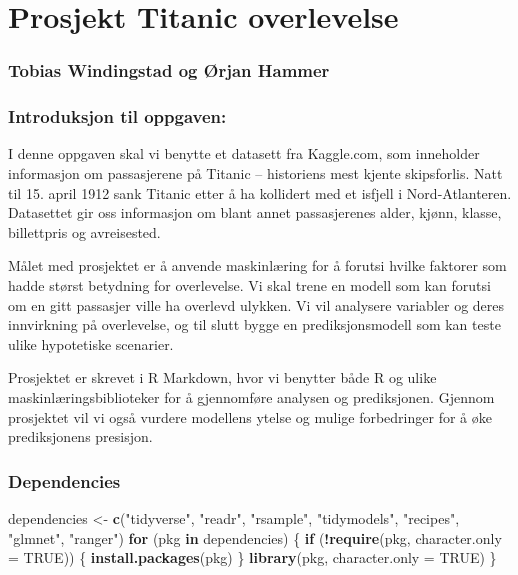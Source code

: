 \documentclass[
]{article}
\author{}
\date{\vspace{-2.5em}}
\newenvironment{Shaded}{\begin{snugshade}}{\end{snugshade}}
\newcommand{\AttributeTok}[1]{\textcolor[rgb]{0.13,0.29,0.53}{#1}}
\newcommand{\ConstantTok}[1]{\textcolor[rgb]{0.56,0.35,0.01}{#1}}
\newcommand{\ControlFlowTok}[1]{\textcolor[rgb]{0.13,0.29,0.53}{\textbf{#1}}}
\newcommand{\FunctionTok}[1]{\textcolor[rgb]{0.13,0.29,0.53}{\textbf{#1}}}
\newcommand{\NormalTok}[1]{#1}
\newcommand{\OtherTok}[1]{\textcolor[rgb]{0.56,0.35,0.01}{#1}}
\newcommand{\SpecialCharTok}[1]{\textcolor[rgb]{0.81,0.36,0.00}{\textbf{#1}}}
\newcommand{\StringTok}[1]{\textcolor[rgb]{0.31,0.60,0.02}{#1}}
\begin{document}
\section{Prosjekt Titanic
overlevelse}\label{prosjekt-titanic-overlevelse}

\subsubsection{Tobias Windingstad og Ørjan
Hammer}\label{tobias-windingstad-og-uxf8rjan-hammer}

\subsubsection{Introduksjon til
oppgaven:}\label{introduksjon-til-oppgaven}

I denne oppgaven skal vi benytte et datasett fra Kaggle.com, som
inneholder informasjon om passasjerene på Titanic -- historiens mest
kjente skipsforlis. Natt til 15. april 1912 sank Titanic etter å ha
kollidert med et isfjell i Nord-Atlanteren. Datasettet gir oss
informasjon om blant annet passasjerenes alder, kjønn, klasse,
billettpris og avreisested.

Målet med prosjektet er å anvende maskinlæring for å forutsi hvilke
faktorer som hadde størst betydning for overlevelse. Vi skal trene en
modell som kan forutsi om en gitt passasjer ville ha overlevd ulykken.
Vi vil analysere variabler og deres innvirkning på overlevelse, og til
slutt bygge en prediksjonsmodell som kan teste ulike hypotetiske
scenarier.

Prosjektet er skrevet i R Markdown, hvor vi benytter både R og ulike
maskinlæringsbiblioteker for å gjennomføre analysen og prediksjonen.
Gjennom prosjektet vil vi også vurdere modellens ytelse og mulige
forbedringer for å øke prediksjonens presisjon.

\subsubsection{Dependencies}\label{dependencies}

\begin{Shaded}
\begin{Highlighting}[]
\NormalTok{dependencies }\OtherTok{\textless{}{-}} \FunctionTok{c}\NormalTok{(}\StringTok{"tidyverse"}\NormalTok{, }\StringTok{"readr"}\NormalTok{, }\StringTok{"rsample"}\NormalTok{, }\StringTok{"tidymodels"}\NormalTok{, }\StringTok{"recipes"}\NormalTok{, }\StringTok{"glmnet"}\NormalTok{, }\StringTok{"ranger"}\NormalTok{)}
\ControlFlowTok{for}\NormalTok{ (pkg }\ControlFlowTok{in}\NormalTok{ dependencies) \{}
  \ControlFlowTok{if}\NormalTok{ (}\SpecialCharTok{!}\FunctionTok{require}\NormalTok{(pkg, }\AttributeTok{character.only =} \ConstantTok{TRUE}\NormalTok{)) \{}
    \FunctionTok{install.packages}\NormalTok{(pkg)}
\NormalTok{  \}}
  \FunctionTok{library}\NormalTok{(pkg, }\AttributeTok{character.only =} \ConstantTok{TRUE}\NormalTok{)}
\NormalTok{\}}
\end{Highlighting}
\end{Shaded}
\end{document}
